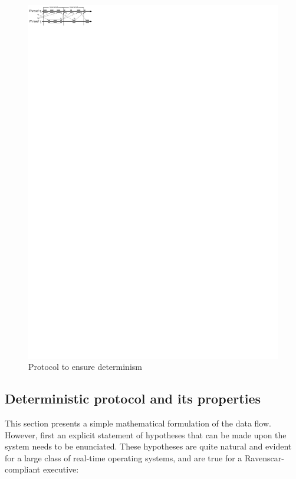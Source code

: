 \begin{figure}
\centering
\includegraphics[scale=1.75]{figs/det_no_breach}
\caption{Protocol to ensure determinism}
\label{fig:determinism}
\end{figure}

\subsection{Deterministic protocol and its properties}
\label{sec:approach}
This section presents a simple mathematical formulation of the data
flow. However, first an explicit statement of hypotheses that can be
made upon the system needs to be enunciated. These hypotheses are
quite natural and evident for a large class of real-time operating
systems, and are true for a Ravenscar-compliant executive:

